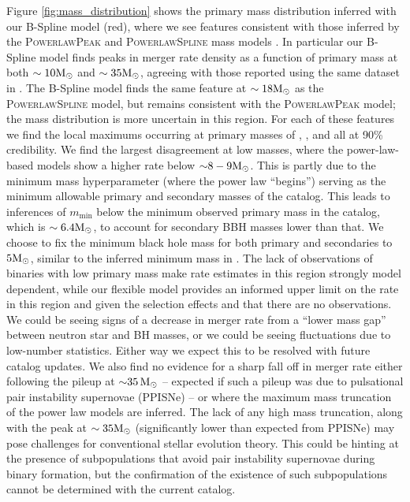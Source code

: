 Figure \ref{fig:mass_distribution} shows the primary mass distribution inferred with our B-Spline model (red), where we see features consistent with those inferred by the \textsc{PowerlawPeak} and \textsc{PowerlawSpline} mass models \citep{Talbot_2018,o3a_pop,Edelman_2022ApJ,o3b_astro_dist,GWTC3POPDATA}. 
In particular our B-Spline model finds peaks in merger rate density as a function of primary mass at both $\sim10{\rm M}_\odot$ and $\sim35{\rm M}_\odot$, agreeing with those 
reported using the same dataset in \citet{o3b_astro_dist}.  The B-Spline model finds the same feature at $\sim18{\rm M}_\odot$ as the \textsc{PowerlawSpline} model, but remains consistent with the \textsc{PowerlawPeak} model; the mass distribution is more uncertain in this region. For each of these features we find the local maximums occurring at primary masses of \result{$\CIPlusMinus{\macros[MassDistribution][BSpline][peaks][10]}\,\msun$},  
\result{$\CIPlusMinus{\macros[MassDistribution][BSpline][peaks][18]}\,\msun$}, and  
\result{$\CIPlusMinus{\macros[MassDistribution][BSpline][peaks][35]}\,\msun$} all at 90\% credibility.
We find the largest disagreement at low masses, where the power-law-based models show a higher rate below ${\sim}8-9{\rm M}_\odot$. This is partly due to the minimum mass hyperparameter (where the power law ``begins'') serving as the minimum allowable primary and secondary masses of the catalog. This leads to inferences of $m_\mathrm{min}$ below the minimum observed primary mass in the catalog, which is $\sim 6.4{\rm M}_\odot$, to account for secondary BBH masses lower than that. We choose to fix the minimum black hole mass for both primary and secondaries to $5{\rm M}_\odot$, 
similar to the inferred minimum mass in \citet{o3b_astro_dist}. The lack of observations of binaries with low primary mass make rate estimates in this region strongly model dependent, while our flexible model provides an informed upper limit on the rate in this region and given the selection effects and that there are no observations. We could be seeing signs of a decrease in merger rate from a ``lower mass gap'' between neutron star and BH masses, or we could be seeing fluctuations due to low-number statistics.  Either way we expect this to be resolved with future catalog updates. We also find no evidence for a sharp fall off in merger rate either following 
the pileup at ${\sim}35\,{\rm M}_\odot$ -- expected if such a pileup was due to pulsational pair instability supernovae (PPISNe) -- or where the maximum mass truncation of the power law models 
are inferred. The lack of any high mass truncation, along with the peak at $\sim35{\rm M}_\odot$ (significantly lower than expected from PPISNe) may pose challenges for conventional stellar 
evolution theory. This could be hinting at the presence of subpopulations that avoid pair instability supernovae during binary formation, but the confirmation of the existence of such subpopulations 
cannot be determined with the current catalog. 

